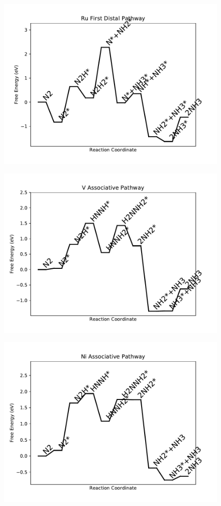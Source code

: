 \begin{figure}
\includegraphics[width=0.8\linewidth]{data/plots/Ru_distal_1.pdf}
\end{figure}

\begin{figure}
\includegraphics[width=0.8\linewidth]{data/plots/V_associative.pdf}
\end{figure}

\begin{figure}
\includegraphics[width=0.8\linewidth]{data/plots/Ni_associative.pdf}
\end{figure}

